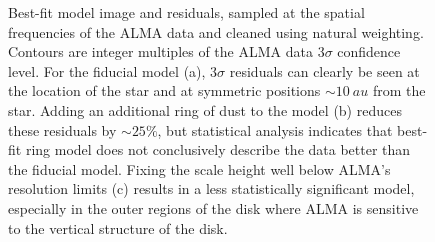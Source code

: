 \documentclass[modern]{aastex62}
\begin{document}
\begin{figure}
  \centering
  
  \qquad
    
  \qquad

  \qquad
    
  \caption{Best-fit model image and residuals, sampled at the spatial frequencies of the ALMA data and cleaned using natural weighting. 
  Contours are integer multiples of the ALMA data $3\sigma$ confidence level. 
  For the fiducial model (a), $3\sigma$ residuals can clearly be seen at the location of the star and at symmetric positions $\sim \SI{10}{au}$ from the star. 
  Adding an additional ring of dust to the model (b) reduces these residuals by $\sim 25 \%$, but statistical analysis indicates that best-fit ring model does not conclusively describe the data better than the fiducial model.
  Fixing the scale height well below ALMA's resolution limits (c) results in a less statistically significant model, especially in the outer regions of the disk where ALMA is sensitive to the vertical structure of the disk.}
\end{figure}
\end{document}
